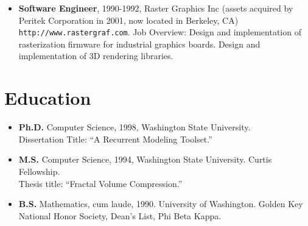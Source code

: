 \documentclass[10pt]{article}
\begin{document}
\begin{itemize}
\item {\bf Software Engineer}, 1990-1992,
Raster Graphics Inc
(assets acquired by Peritek Corporation in 2001, now
located in Berkeley, CA)
{\tt http://www.rastergraf.com}.
Job Overview: 
Design and implementation of rasterization firmware for
industrial graphics boards. Design and implementation of
3D rendering libraries.
\end{itemize}


\section*{Education}

\begin{itemize}
\item {\bf Ph.D.} Computer Science, 1998,
Washington State University. \\
Dissertation Title: ``A Recurrent Modeling Toolset.''

\item {\bf M.S.} Computer Science, 1994,
Washington State University. Curtis Fellowship. \\
Thesis title: ``Fractal Volume Compression.''


\item {\bf B.S.} Mathematics, cum laude, 1990.
University of Washington. 
Golden Key National Honor Society, Dean's List, Phi Beta Kappa.
\end{itemize}

%
\end{document}
